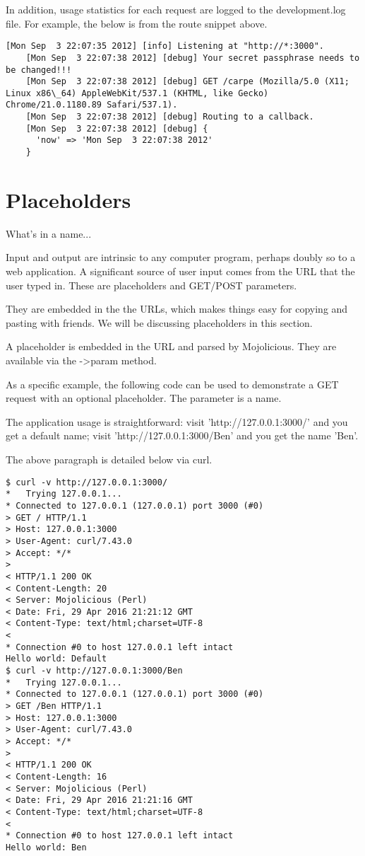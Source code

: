 \documentclass[14pt]{extreport}
\begin{document}
In addition, usage statistics for each request are logged to the
development.log file.  For example, the below is from the route snippet above.

\begin{lstlisting}[style=BashOutputStyle]
    [Mon Sep  3 22:07:35 2012] [info] Listening at "http://*:3000".
    [Mon Sep  3 22:07:38 2012] [debug] Your secret passphrase needs to be changed!!!
    [Mon Sep  3 22:07:38 2012] [debug] GET /carpe (Mozilla/5.0 (X11; Linux x86\_64) AppleWebKit/537.1 (KHTML, like Gecko) Chrome/21.0.1180.89 Safari/537.1).
    [Mon Sep  3 22:07:38 2012] [debug] Routing to a callback.
    [Mon Sep  3 22:07:38 2012] [debug] {
      'now' => 'Mon Sep  3 22:07:38 2012'
    }
\end{lstlisting}

\section{Placeholders}

{\Large What's in a name...}

Input and output are intrinsic to any computer program, perhaps doubly so to a
web application.  A significant source of user input comes from the URL that the
user typed in.  These are placeholders and GET/POST parameters.

They are embedded in the the URLs, which makes things easy for copying and
pasting with friends.  We will be discussing placeholders in this section.

A placeholder is embedded in the URL and parsed by Mojolicious.  They are
available via the ->param method.

As a specific example, the following code can be used to demonstrate a GET
request with an optional placeholder.  The parameter is a name.



The application usage is straightforward: visit 'http://127.0.0.1:3000/' and
you get a default name; visit 'http://127.0.0.1:3000/Ben' and you get the name
'Ben'.

The above paragraph is detailed below via curl.

\clearpage

\begin{lstlisting}[style=BashOutputStyle]
$ curl -v http://127.0.0.1:3000/ 
*   Trying 127.0.0.1...
* Connected to 127.0.0.1 (127.0.0.1) port 3000 (#0)
> GET / HTTP/1.1
> Host: 127.0.0.1:3000
> User-Agent: curl/7.43.0
> Accept: */*
> 
< HTTP/1.1 200 OK
< Content-Length: 20
< Server: Mojolicious (Perl)
< Date: Fri, 29 Apr 2016 21:21:12 GMT
< Content-Type: text/html;charset=UTF-8
< 
* Connection #0 to host 127.0.0.1 left intact
Hello world: Default
$ curl -v http://127.0.0.1:3000/Ben
*   Trying 127.0.0.1...
* Connected to 127.0.0.1 (127.0.0.1) port 3000 (#0)
> GET /Ben HTTP/1.1
> Host: 127.0.0.1:3000
> User-Agent: curl/7.43.0
> Accept: */*
> 
< HTTP/1.1 200 OK
< Content-Length: 16
< Server: Mojolicious (Perl)
< Date: Fri, 29 Apr 2016 21:21:16 GMT
< Content-Type: text/html;charset=UTF-8
< 
* Connection #0 to host 127.0.0.1 left intact
Hello world: Ben
\end{lstlisting}
\end{document}

